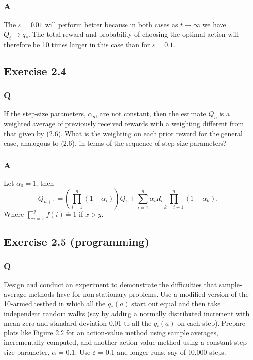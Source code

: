 \subsubsection*{A}
The $\varepsilon = 0.01$ will perform better because in both cases as $t \to \infty$ we have $Q_t \to q_*$. The total reward and probability of choosing the optimal action will therefore be 10 times larger in this case than for $\varepsilon = 0.1$.


\subsection{Exercise 2.4}
\label{ex:2.4}
\subsubsection*{Q}
If the step-size parameters, $\alpha_n$, are not constant, then the estimate $Q_n$ is a weighted average of previously received rewards with a weighting different from that given by (2.6). What is the weighting on each prior reward for the general case, analogous to (2.6), in terms of the sequence of step-size parameters?

\subsubsection*{A}
Let $\alpha_0 = 1$, then 
\begin{equation}
    Q_{n + 1} = \left(\prod_{i=1}^n (1 - \alpha_i) \right) Q_1 + \sum_{i = 1}^{n}  \alpha_{i} R_{i} \prod_{k = i + 1}^n
(1 - \alpha_k).
\end{equation}
Where $\prod_{i=x}^y f(i) \doteq 1$ if $x > y$.

\subsection{Exercise 2.5 (programming)}
\subsubsection*{Q}
Design and conduct an experiment to demonstrate the difficulties that sample-average methods have for non-stationary problems. Use a modified version of the 10-armed testbed in which all the $q_*(a)$ start out equal and then take independent random walks (say by adding a normally distributed increment with mean zero and standard deviation 0.01 to all the $q_*(a)$ on each step). Prepare plots like Figure 2.2 for an action-value method using sample averages, incrementally computed, and another action-value method using a constant step-size parameter, $\alpha$ = 0.1. Use $\varepsilon$ = 0.1 and longer runs, say of 10,000 steps.

